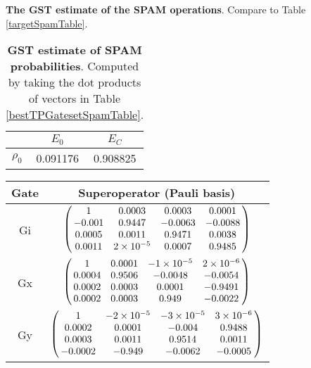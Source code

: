 {\begin{table}[h]
\begin{center}
\caption{\textbf{The GST estimate of the SPAM operations}.  Compare to Table \ref{targetSpamTable}.\label{bestTPGatesetSpamTable}}
\end{center}
\end{table}

\begin{table}[h]
\begin{center}
\begin{tabular}[l]{|c|c|c|}
\hline
 & $E_{0}$ & $E_C$ \\ \hline
$\rho_{0}$ & 0.091176 & 0.908825 \\ \hline
\end{tabular}

\caption{\textbf{GST estimate of SPAM probabilities}.  Computed by taking the dot products of vectors in Table \ref{bestTPGatesetSpamTable}.\label{bestTPGatesetSpamParametersTable}}
\end{center}
\end{table}

\begin{table}[h]
\begin{center}
\begin{tabular}[l]{|c|c|}
\hline
Gate & Superoperator (Pauli basis) \\ \hline
Gi & $ \left(\!\!\begin{array}{cccc}
1 & 0.0003 & 0.0003 & 0.0001 \\ 
-0.001 & 0.9447 & -0.0063 & -0.0088 \\ 
0.0005 & 0.0011 & 0.9471 & 0.0038 \\ 
0.0011 & 2\times 10^{-5} & 0.0007 & 0.9485
 \end{array}\!\!\right) $
 \\ \hline
Gx & $ \left(\!\!\begin{array}{cccc}
1 & 0.0001 & -1\times 10^{-5} & 2\times 10^{-6} \\ 
0.0004 & 0.9506 & -0.0048 & -0.0054 \\ 
0.0002 & 0.0003 & 0.0001 & -0.9491 \\ 
0.0002 & 0.0003 & 0.949 & -0.0022
 \end{array}\!\!\right) $
 \\ \hline
Gy & $ \left(\!\!\begin{array}{cccc}
1 & -2\times 10^{-5} & -3\times 10^{-5} & 3\times 10^{-6} \\ 
0.0002 & 0.0001 & -0.004 & 0.9488 \\ 
0.0003 & 0.0011 & 0.9514 & 0.0011 \\ 
-0.0002 & -0.949 & -0.0062 & -0.0005
 \end{array}\!\!\right) $
 \\ \hline
\end{tabular}


\end{center}
\end{table}}
